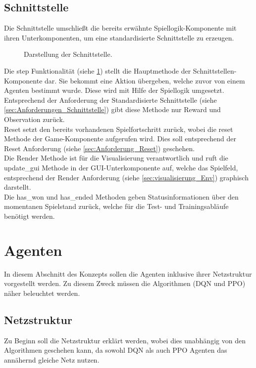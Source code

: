 \subsection{Schnittstelle} \label{sec:Konzept_Schnittstelle}
Die Schnittstelle umschließt die bereits erwähnte Spiellogik-Komponente mit ihren Unterkomponenten, um eine standardisierte Schnittstelle zu erzeugen.
\begin{figure}[H]
	\centering
	\def\svgscale{0.15}
	
	\caption[Schnittstelle]{Darstellung der Schnittstelle.}
	\label{fig:Schnittstelle}
\end{figure}
Die step Funktionalität (siehe \ref{fig:Schnittstelle}) stellt die Hauptmethode der Schnittstellen-Komponente dar. Sie bekommt eine Aktion übergeben, welche zuvor von einem Agenten bestimmt wurde. Diese wird mit Hilfe der Spiellogik umgesetzt. Entsprechend der Anforderung der Standardisierte Schnittstelle (siehe \ref{sec:Anforderungen_Schnittstelle}) gibt diese Methode nur Reward und Observation zurück.\\
Reset setzt den bereits vorhandenen Spielfortschritt zurück, wobei die reset Methode der Game-Komponente aufgerufen wird. Dies soll entsprechend der Reset Anforderung (siehe \ref{sec:Anforderung_Reset}) geschehen.\\
Die Render Methode ist für die Visualisierung verantwortlich und ruft die update\_gui Methode in der GUI-Unterkomponente auf, welche das Spielfeld, entsprechend der Render Anforderung (siehe \ref{sec:visualisierung_Env}) graphisch darstellt.\\
Die has\_won und has\_ended Methoden geben Statusinformationen über den momentanen Spielstand zurück, welche für die Test- und Trainingsabläufe benötigt werden.

\newpage
\section{Agenten} \label{sec:Konzept_Agenten}
In diesem Abschnitt des Konzepts sollen die Agenten inklusive ihrer Netzstruktur vorgestellt werden. Zu diesem Zweck müssen die Algorithmen (DQN und PPO) näher beleuchtet werden.

\subsection{Netzstruktur} \label{sec:Konzept_Netzstruktur}
Zu Beginn soll die Netzstruktur erklärt werden, wobei dies unabhängig von den Algorithmen geschehen kann, da sowohl DQN als auch PPO Agenten das annähernd gleiche Netz nutzen.

